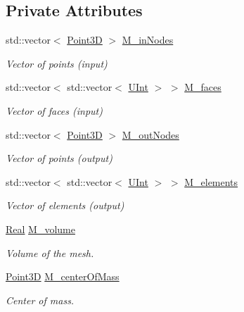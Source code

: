 \subsection*{Private Attributes}
\begin{DoxyCompactItemize}
\item 
std\+::vector$<$ \hyperlink{classFVCode3D_1_1Point3D}{Point3D} $>$ \hyperlink{classFVCode3D_1_1TetGenWrapper_ae0637911dffc55fc74b5414fc6e8e417}{M\+\_\+in\+Nodes}
\begin{DoxyCompactList}\small\item\em Vector of points (input) \end{DoxyCompactList}\item 
std\+::vector$<$ std\+::vector$<$ \hyperlink{namespaceFVCode3D_a4bf7e328c75d0fd504050d040ebe9eda}{U\+Int} $>$ $>$ \hyperlink{classFVCode3D_1_1TetGenWrapper_ae883359645d72961078fe02a886df3be}{M\+\_\+faces}
\begin{DoxyCompactList}\small\item\em Vector of faces (input) \end{DoxyCompactList}\item 
std\+::vector$<$ \hyperlink{classFVCode3D_1_1Point3D}{Point3D} $>$ \hyperlink{classFVCode3D_1_1TetGenWrapper_a04672b7a2b60730190e0e82af43ed38b}{M\+\_\+out\+Nodes}
\begin{DoxyCompactList}\small\item\em Vector of points (output) \end{DoxyCompactList}\item 
std\+::vector$<$ std\+::vector$<$ \hyperlink{namespaceFVCode3D_a4bf7e328c75d0fd504050d040ebe9eda}{U\+Int} $>$ $>$ \hyperlink{classFVCode3D_1_1TetGenWrapper_a016da330a68cb7cd44881dc26efed5b5}{M\+\_\+elements}
\begin{DoxyCompactList}\small\item\em Vector of elements (output) \end{DoxyCompactList}\item 
\hyperlink{namespaceFVCode3D_a40c1f5588a248569d80aa5f867080e83}{Real} \hyperlink{classFVCode3D_1_1TetGenWrapper_a820391e6d290e49db68b107fd5ab0e75}{M\+\_\+volume}
\begin{DoxyCompactList}\small\item\em Volume of the mesh. \end{DoxyCompactList}\item 
\hyperlink{classFVCode3D_1_1Point3D}{Point3D} \hyperlink{classFVCode3D_1_1TetGenWrapper_a4c2e389ea6cc0cec7c83b7e241976807}{M\+\_\+center\+Of\+Mass}
\begin{DoxyCompactList}\small\item\em Center of mass. \end{DoxyCompactList}\end{DoxyCompactItemize}



